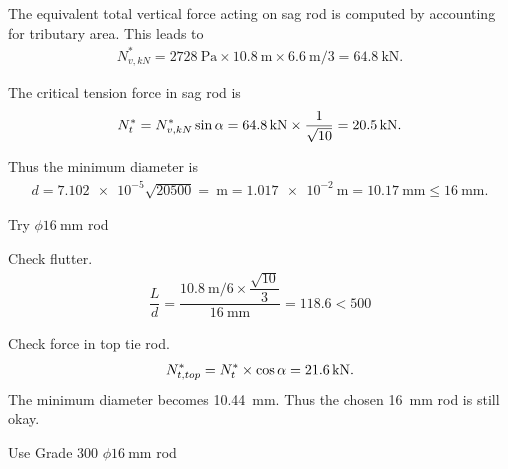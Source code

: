 \begin{solution}
The equivalent total vertical force acting on sag rod is computed by accounting for tributary area. This leads to
\begin{gather*}
N^*_{v,kN}=\SI{2728}{\pascal}\times\SI{10.8}{\meter}\times\SI{6.6}{\meter}/3=\SI{64.8}{\kilo\newton}.
\end{gather*}

The critical tension force in sag rod is
\begin{gather*}
N^*_t=N^*_{v,kN}\sin\alpha=\SI{64.8}{\kilo\newton}\times\dfrac{1}{\sqrt{10}}=\SI{20.5}{\kilo\newton}.
\end{gather*}
\begin{figure}[H]
\centering\footnotesize
{}
\end{figure}

Thus the minimum diameter is
\begin{gather*}
d=\num{7.102e-5}\sqrt{20500}=\SI{}{\meter}=\SI{1.017e-2}{\meter}=\SI{10.17}{\mm}\le\SI{16}{\mm}.
\end{gather*}
\begin{flushright}
Try $\phi\SI{16}{\mm}$ rod
\end{flushright}

Check flutter.
\begin{gather}
\dfrac{L}{d}=\dfrac{\SI{10.8}{\meter}/6\times\dfrac{\sqrt{10}}{3}}{\SI{16}{\mm}}=118.6<500
\end{gather}

Check force in top tie rod.
\begin{gather*}
N^*_{t,top}=N^*_t\times\cos\alpha=\SI{21.6}{\kilo\newton}.
\end{gather*}
The minimum diameter becomes \SI{10.44}{\mm}. Thus the chosen \SI{16}{\mm} rod is still okay.
\begin{figure}[H]
\centering\footnotesize
{}
\end{figure}
\begin{flushright}
Use Grade 300 $\phi\SI{16}{\mm}$ rod
\end{flushright}
\end{solution}